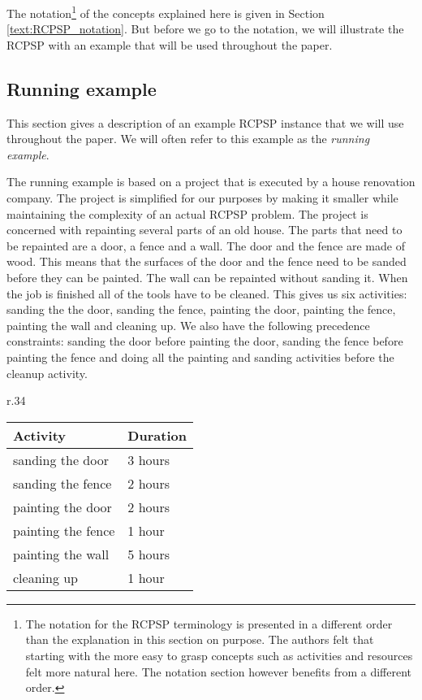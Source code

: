 \documentclass{article}
\theoremstyle{definition}
\begin{document}
The notation\footnote{The notation for the RCPSP terminology is presented in a different order than the explanation in this section on purpose. The authors felt that starting with the more easy to grasp concepts such as activities and resources felt more natural here.
The notation section however benefits from a different order. } of the concepts explained here is given in Section \ref{text:RCPSP_notation}.
But before we go to the notation, we will illustrate the RCPSP with an example that will be used throughout the paper. 

\subsection{Running example}
\label{text:running_example_description}
This section gives a description of an example RCPSP instance that we will use throughout the paper. 
We will often refer to this example as the \emph{running example}. 

The running example is based on a project that is executed by a house renovation company. 
The project is simplified for our purposes by making it smaller while maintaining the complexity of an actual RCPSP problem. 
The project is concerned with repainting several parts of an old house. 
The parts that need to be repainted are a door, a fence and a wall. 
The door and the fence are made of wood. 
This means that the surfaces of the door and the fence need to be sanded before they can be painted. 
The wall can be repainted without sanding it. 
When the job is finished all of the tools have to be cleaned. 
This gives us six activities: sanding the the door, sanding the fence,  painting the door, painting the fence, painting the wall and cleaning up. 
We also have the following precedence constraints: sanding the door before painting the door, sanding the fence before painting the fence and doing all the painting and sanding activities before the cleanup activity. 

\begin{wraptable}{r}{.34\textwidth}
	\centering
	\vspace{-.6em}
	\begin{tabular}{l|l}
		{Activity} & {Duration} \\
		\hline
		sanding the door & 3 hours\\
		sanding the fence & 2 hours\\
		painting the door & 2 hours\\
		painting the fence & 1 hour\\
		painting the wall & 5 hours\\
		cleaning up & 1 hour\\
		\hline
	\end{tabular}
	\vspace{-.3em}
	\caption{Activity durations}
	\label{table:activity_durations}
	\vspace{-.6em}
\end{wraptable}
\end{document}
